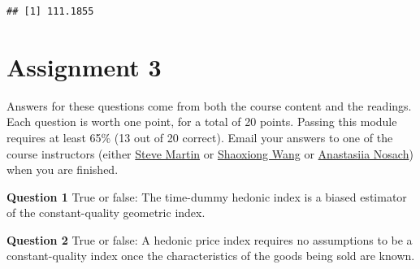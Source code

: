 \documentclass[
]{article}
\newenvironment{Shaded}{\begin{snugshade}}{\end{snugshade}}
\newcommand{\AttributeTok}[1]{\textcolor[rgb]{0.77,0.63,0.00}{#1}}
\newcommand{\CommentTok}[1]{\textcolor[rgb]{0.56,0.35,0.01}{\textit{#1}}}
\newcommand{\DecValTok}[1]{\textcolor[rgb]{0.00,0.00,0.81}{#1}}
\newcommand{\FunctionTok}[1]{\textcolor[rgb]{0.00,0.00,0.00}{#1}}
\newcommand{\NormalTok}[1]{#1}
\newcommand{\OtherTok}[1]{\textcolor[rgb]{0.56,0.35,0.01}{#1}}
\newcommand{\SpecialCharTok}[1]{\textcolor[rgb]{0.00,0.00,0.00}{#1}}
\begin{document}
\begin{Shaded}
\end{Shaded}

\begin{verbatim}
## [1] 111.1855
\end{verbatim}

\hypertarget{assignment-3}{%
\section{Assignment 3}\label{assignment-3}}

Answers for these questions come from both the course content and the readings. Each question is worth one point, for a total of 20 points. Passing this module requires at least 65\% (13 out of 20 correct). Email your answers to one of the course instructors (either \href{mailto:steve.martin5@canada.ca}{Steve Martin} or \href{mailto:shaoxiong.wang@canada.ca}{Shaoxiong Wang} or \href{mailto:anastasiia.nosach@canada.ca}{Anastasiia Nosach}) when you are finished.

\textbf{Question 1} True or false: The time-dummy hedonic index is a biased estimator of the constant-quality geometric index.

\textbf{Question 2} True or false: A hedonic price index requires no assumptions to be a constant-quality index once the characteristics of the goods being sold are known.
\end{document}
